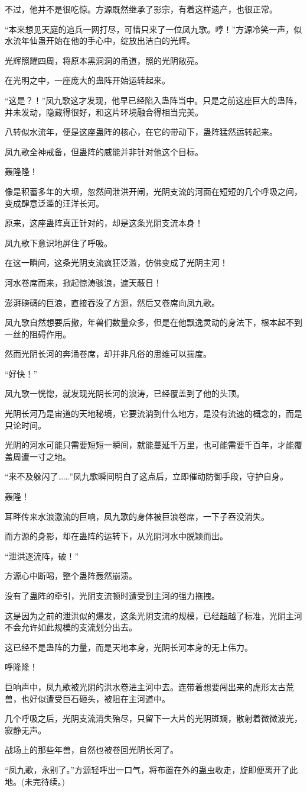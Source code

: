 \begin{this_body}
不过，他并不是很吃惊。方源既然继承了影宗，有着这样遗产，也很正常。

“本来想见天庭的追兵一网打尽，可惜只来了一位凤九歌。哼！”方源冷笑一声，似水流年仙蛊开始在他的手心中，绽放出洁白的光辉。

光辉照耀四周，将原本黑洞洞的甬道，照的光阴敞亮。

在光明之中，一座庞大的蛊阵开始运转起来。

“这是？！”凤九歌这才发现，他早已经陷入蛊阵当中。只是之前这座巨大的蛊阵，并未发动，隐藏得很好，和这片环境融合得相当完美。

八转似水流年，便是这座蛊阵的核心，在它的带动下，蛊阵猛然运转起来。

凤九歌全神戒备，但蛊阵的威能并非针对他这个目标。

轰隆隆！

像是积蓄多年的大坝，忽然间泄洪开闸，光阴支流的河面在短短的几个呼吸之间，变成肆意泛滥的汪洋长河。

原来，这座蛊阵真正针对的，却是这条光阴支流本身！

凤九歌下意识地屏住了呼吸。

在这一瞬间，这条光阴支流疯狂泛滥，仿佛变成了光阴主河！

河水卷席而来，掀起惊涛骇浪，遮天蔽日！

澎湃磅礴的巨浪，直接吞没了方源，然后又卷席向凤九歌。

凤九歌自然想要后撤，年兽们数量众多，但是在他飘逸灵动的身法下，根本起不到一丝的阻碍作用。

然而光阴长河的奔涌卷席，却并非凡俗的思维可以揣度。

“好快！”

凤九歌一恍惚，就发现光阴长河的浪涛，已经覆盖到了他的头顶。

光阴长河乃是宙道的天地秘境，它要流淌到什么地方，是没有流速的概念的，而是只论时间。

光阴的河水可能只需要短短一瞬间，就能蔓延千万里，也可能需要千百年，才能覆盖周遭一寸之地。

“来不及躲闪了……”凤九歌瞬间明白了这点后，立即催动防御手段，守护自身。

轰隆！

耳畔传来水浪激流的巨响，凤九歌的身体被巨浪卷席，一下子吞没消失。

而方源的身影，却在蛊阵的运转下，从光阴河水中脱颖而出。

“泄洪逐流阵，破！”

方源心中断喝，整个蛊阵轰然崩溃。

没有了蛊阵的牵引，光阴支流顿时遭受到主河的强力拖拽。

这是因为之前的泄洪似的爆发，这条光阴支流的规模，已经超越了标准，光阴主河不会允许如此规模的支流划分出去。

这已经不是蛊阵的力量，而是天地本身，光阴长河本身的无上伟力。

呼隆隆！

巨响声中，凤九歌被光阴的洪水卷进主河中去。连带着想要闯出来的虎形太古荒兽，也好似遭受巨石砸头，被阻在主河道中。

几个呼吸之后，光阴支流消失殆尽，只留下一大片的光阴斑斓，散射着微微波光，寂静无声。

战场上的那些年兽，自然也被卷回光阴长河了。

“凤九歌，永别了。”方源轻呼出一口气，将布置在外的蛊虫收走，旋即便离开了此地。(未完待续。)

\end{this_body}

